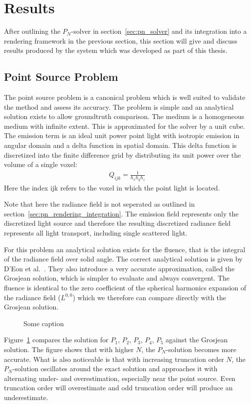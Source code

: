 \section{Results}
\label{sec:pn_results}

After outlining the $P_N$-solver in section~\ref{sec:pn_solver} and its integration into a rendering framework in the previous section, this section will give and discuss results produced by the system which was developed as part of this thesis.

\subsection{Point Source Problem}
\label{sec:pn_results_pointsource}

The point source problem is a canonical problem which is well suited to validate the method and assess its accuracy. The problem is simple and an analytical solution exists to allow groundtruth comparison. The medium is a homogeneous medium with infinite extent. This is approximated for the solver by a unit cube. The emission term is an ideal unit power point light with isotropic emission in angular domain and a delta function in spatial domain. This delta function is discretized into the finite difference grid by distributing its unit power over the volume of a single voxel:
\begin{align}
Q_{ijk} = \frac{1}{h_xh_yh_z}
\end{align}
Here the index {ijk} refers to the voxel in which the point light is located.

Note that here the radiance field is not seperated as outlined in section~\ref{sec:pn_rendering_integration}. The emission field represents only the discretized light source and therefore the resulting discretized radiance field represents all light transport, including single scattered light.

For this problem an analytical solution exists for the fluence, that is the integral of the radiance field over solid angle. The correct analytical solution is given by D'Eon et al.~\cite{dEon11}. They also introduce a very accurate approximation, called the Grosjean solution, which is simpler to evaluate and always convergent. The fluence is identical to the zero coefficient of the spherical harmonics expansion of the radiance field ($L^{0,0}$) which we therefore can compare directly with the Grosjean solution.
\begin{figure}[h]
\centering
{}
\caption{Some caption}
\label{fig:pn_results_pointsource_1}
\end{figure}
Figure~\ref{fig:pn_results_pointsource_1} compares the solution for $P_1$, $P_2$, $P_3$, $P_4$, $P_5$ against the Grosjean solution. The figure shows that with higher $N$, the $P_N$-solution becomes more accurate. What is also noticeable is that with increasing truncation order $N$, the $P_N$-solution oscillates around the exact solution and approaches it with alternating under- and overestimation, especially near the point source. Even truncation order will overestimate and odd truncation order will produce an underestimate. 

